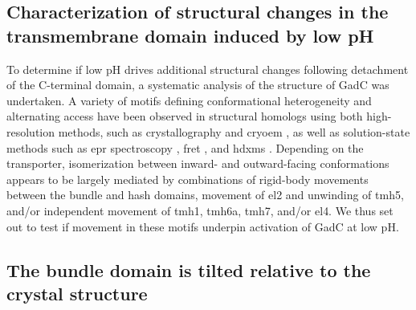 \subsection{Characterization of structural changes in the transmembrane domain induced by low pH}

To determine if low pH drives additional structural changes following detachment of the C-terminal domain, a systematic analysis of the structure of GadC was undertaken. A variety of motifs defining conformational heterogeneity and alternating access have been observed in structural homologs using both high-resolution methods, such as crystallography and \gls{cryoem} \citep*{Bozzi2019, Kazmier2017, Krishnamurthy2012, Lee2019, Liu2019, Perez2012, Shimamura2010,  Weyand2008, Yamashita2005, Yan2019}, as well as solution-state methods such as \gls{epr} spectroscopy \citep*{Claxton2010, Kazmier2014, Kazmier2014a, Paz2018}, \gls{fret} \citep*{Zhao2010}, and \gls{hdxms} \citep*{Adhikary2017, Merkle2018, Moeller2019, Nielsen2019}. Depending on the transporter, isomerization between inward- and outward-facing conformations appears to be largely mediated by combinations of rigid-body movements between the bundle and hash domains, movement of \gls{el}2 and unwinding of \gls{tmh}5, and/or independent movement of \gls{tmh}1, \gls{tmh}6a, \gls{tmh}7, and/or \gls{el}4. We thus set out to test if movement in these motifs underpin activation of GadC at low pH.
	
\subsection{The bundle domain is tilted relative to the crystal structure}

